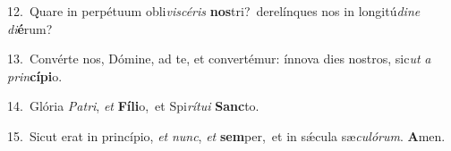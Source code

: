 {\numbfont\textcolor{\numbcolor}{12.}}~Quare in perpétuum obli\-\textit{vi}\-\textit{scé}\textit{ris} \textbf{nos}\-tri?~\star derelínques nos in longitú\-\textit{di}\-\textit{ne} \textit{di}\-\textbf{é}rum?\par
{\numbfont\textcolor{\numbcolor}{13.}}~Convérte nos, Dómine, ad te, et convertémur: ínnova dies nostros, sic\textit{ut} \textit{a} \textit{prin}\-\textbf{cí}\textbf{pi}o.\par
{\numbfont\textcolor{\numbcolor}{14.}}~Glória \textit{Pa}\-\textit{tri}, \textit{et} \textbf{Fí}\-\textbf{li}o,~\star et Spi\-\textit{rí}\-\textit{tu}\textit{i} \textbf{Sanc}\-to.\par
{\numbfont\textcolor{\numbcolor}{15.}}~Sicut erat in princípio, \textit{et} \textit{nunc}\-, \textit{et} \textbf{sem}\-per,~\star et in sǽcula sæ\-\textit{cu}\-\textit{ló}\textit{rum}. \textbf{A}\-men.\par
